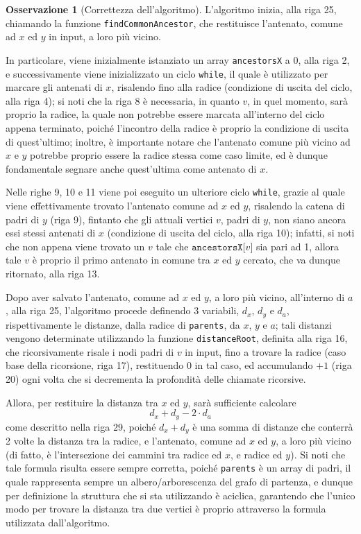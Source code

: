 \documentclass[14pt]{extreport}
\theoremstyle{definition}
\theoremstyle{definition}
\newtheorem{remark}{Osservazione}[subsection]
\begin{document}
\begin{remark}[Correttezza dell'algoritmo]
    L'algoritmo inizia, alla riga 25, chiamando la funzione \texttt{findCommonAncestor}, che restituisce l'antenato, comune ad $x$ ed $y$ in input, a loro più vicino.

    In particolare, viene inizialmente istanziato un array \texttt{ancestorsX} a 0, alla riga 2, e successivamente viene inizializzato un ciclo \texttt{while}, il quale è utilizzato per marcare gli antenati di $x$, risalendo fino alla radice (condizione di uscita del ciclo, alla riga 4); si noti che la riga 8 è necessaria, in quanto $v$, in quel momento, sarà proprio la radice, la quale non potrebbe essere marcata all'interno del ciclo appena terminato, poiché l'incontro della radice è proprio la condizione di uscita di quest'ultimo; inoltre, è importante notare che l'antenato comune più vicino ad $x$ e $y$ potrebbe proprio essere la radice stessa come caso limite, ed è dunque fondamentale segnare anche quest'ultima come antenato di $x$.

    Nelle righe 9, 10 e 11 viene poi eseguito un ulteriore ciclo \texttt{while}, grazie al quale viene effettivamente trovato l'antenato comune ad $x$ ed $y$, risalendo la catena di padri di $y$ (riga 9), fintanto che gli attuali vertici $v$, padri di $y$, non siano ancora essi stessi antenati di $x$ (condizione di uscita del ciclo, alla riga 10); infatti, si noti che non appena viene trovato un $v$ tale che $\texttt{ancestorsX[}v\texttt{]}$ sia pari ad 1, allora tale $v$ è proprio il primo antenato in comune tra $x$ ed $y$ cercato, che va dunque ritornato, alla riga 13.

    Dopo aver salvato l'antenato, comune ad $x$ ed $y$, a loro più vicino, all'interno di $a$, alla riga 25, l'algoritmo procede definendo 3 variabili, $d_x$, $d_y$ e $d_a$, rispettivamente le distanze, dalla radice di \texttt{parents}, da $x$, $y$ e $a$; tali distanzi vengono determinate utilizzando la funzione \texttt{distanceRoot}, definita alla riga 16, che ricorsivamente risale i nodi padri di $v$ in input, fino a trovare la radice (caso base della ricorsione, riga 17), restituendo 0 in tal caso, ed accumulando $+1$ (riga 20) ogni volta che si decrementa la profondità delle chiamate ricorsive.

    Allora, per restituire la distanza tra $x$ ed $y$, sarà sufficiente calcolare $$d_x + d_y - 2 \cdot d_a$$ come descritto nella riga 29, poiché $d_x + d_y$ è una somma di distanze che conterrà 2 volte la distanza tra la radice, e l'antenato, comune ad $x$ ed $y$, a loro più vicino (di fatto, è l'intersezione dei cammini tra radice ed $x$, e radice ed $y$). Si noti che tale formula risulta essere sempre corretta, poiché \texttt{parents} è un array di padri, il quale rappresenta sempre un albero/arborescenza del grafo di partenza, e dunque per definizione la struttura che si sta utilizzando è aciclica, garantendo che l'unico modo per trovare la distanza tra due vertici è proprio attraverso la formula utilizzata dall'algoritmo.
\end{remark}
\end{document}
